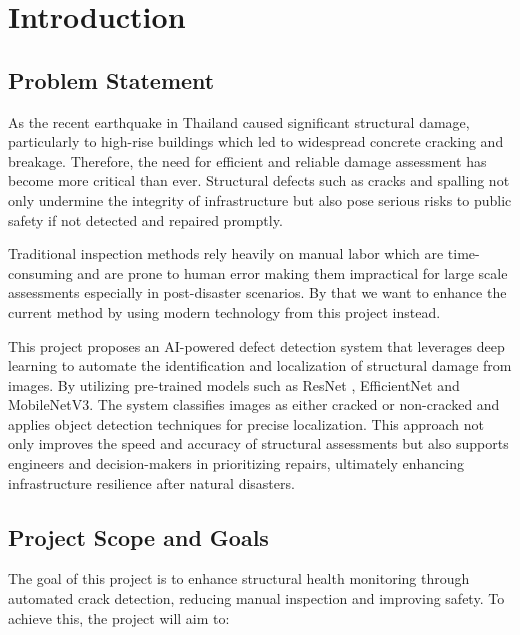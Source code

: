 \chapter{Introduction}

\section{Problem Statement}

As the recent earthquake in Thailand caused significant structural damage, particularly to high-rise buildings which led to widespread concrete cracking and breakage. \cite{laosunthara2025mandalay} Therefore, the need for efficient and reliable damage assessment has become more critical than ever. Structural defects such as cracks and spalling not only undermine the integrity of infrastructure but also pose serious risks to public safety if not detected and repaired promptly.

Traditional inspection methods rely heavily on manual labor which are time-consuming and are prone to human error making them impractical for large scale assessments especially in post-disaster scenarios. By that we want to enhance the current method by using modern technology from this project instead. \cite{Forsyth2019-lc}

This project proposes an AI-powered defect detection system that leverages deep learning to automate the identification and localization of structural damage from images. By utilizing pre-trained models such as ResNet \cite{He2015DeepRL}, EfficientNet\cite{pmlr-v97-tan19a} and MobileNetV3\cite{howard2019searchingmobilenetv3}. The system classifies images as either cracked or non-cracked and applies object detection techniques for precise localization. This approach not only improves the speed and accuracy of structural assessments but also supports engineers and decision-makers in prioritizing repairs, ultimately enhancing infrastructure resilience after natural disasters.

\section{Project Scope and Goals}

The goal of this project is to enhance structural health monitoring through automated crack detection, reducing manual inspection and improving safety. To achieve this, the project will aim to:


